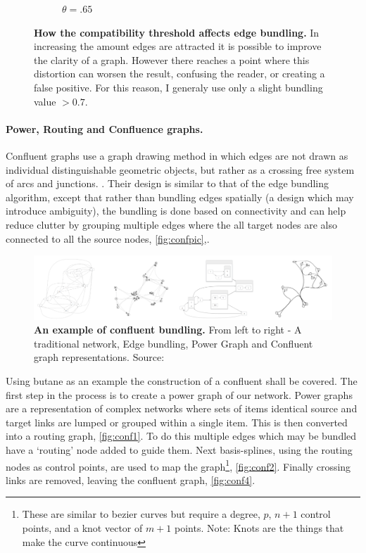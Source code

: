 \begin{figure}[H]
\begin{subfigure}[b]{.49\textwidth}
 \caption{$\theta = .65$}
 \end{subfigure}
        \caption{\textbf{How the compatibility threshold affects edge bundling.} In increasing the amount edges are attracted it is possible to improve the clarity of a graph. However there reaches a point where this distortion can worsen the result, confusing the reader, or creating a false positive. For this reason, I generaly use only a slight bundling value $> 0.7$.}
      \label{fig:edgebundling}
\end{figure}

\paragraph{Power, Routing and Confluence graphs.}

Confluent graphs use a graph drawing method in which edges are not drawn as individual distinguishable geometric objects, but rather as a crossing free system of arcs and junctions. \cite{confluient19}. Their design is similar to that of the edge bundling algorithm, except that rather than bundling edges spatially (a design which may introduce ambiguity), the bundling is done based on connectivity and can help reduce clutter by grouping multiple edges where the all target nodes are also connected to all the source nodes, \autoref{fig:confpic},\cite{confpic}. 

\begin{figure}[H]
     \centering
     \includegraphics[width=.9\textwidth]{figures_c1/layout/confluent/example.png}
        \caption{\textbf{An example of confluent bundling. } From left to right -  A traditional network, Edge bundling, Power Graph and Confluent graph representations. Source: \cite{confpic}}
      \label{fig:confpic}
\end{figure}

Using butane as an example the construction of a confluent shall be covered. The first step in the process is to create
a power graph of our network. Power graphs are a representation of complex networks where sets of items identical source and target links are lumped or grouped within a single item. This is then converted into a routing graph, \autoref{fig:conf1}. To do this multiple edges which may be bundled have a `routing' node added to guide them. Next basis-splines, using the routing nodes as control points, are used to map the graph\footnote{These are similar to bezier curves but require a degree, $p$, $n+1$ control points, and a knot vector of $m+1$ points. Note: Knots are the things that make the curve continuous }, \autoref{fig:conf2}. Finally crossing links are removed, leaving the confluent graph, \autoref{fig:conf4}. 

